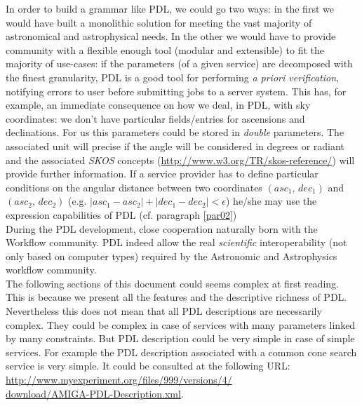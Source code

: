 \documentclass[a4paper,11pt] {ivoa}
\begin{document}
In order to build a grammar like PDL, we could go two ways: in the first we would have built a monolithic solution for meeting the vast majority of astronomical and astrophysical needs. In the other we would have to provide community with a flexible enough tool  (modular and extensible) to fit the majority of use-cases: if the parameters (of a given service) are decomposed with the finest granularity, PDL is a good tool for performing {\it a priori verification}, notifying errors to user before submitting jobs to a server system.
This has, for example, an immediate consequence on how we deal, in PDL, with sky coordinates: we don't have particular fields/entries for ascensions and declinations. For us this parameters could be stored in {\it double} parameters. The associated unit will precise if the angle will be considered in degrees or radiant  and the associated {\it SKOS} concepts
(\href{http://www.w3.org/TR/skos-reference/}{http://www.w3.org/TR/skos-reference/}) will provide further information. If a service provider has to define particular conditions on the angular distance between two coordinates $(asc_1, \, dec_1)$ and $(asc_2, \, dec_2)$ (e.g. $|asc_1- asc_2|+|dec_1-dec_2|<\epsilon$) he/she may use the expression capabilities of PDL (cf. paragraph \ref{par02})\\

\noindent During the PDL development, close cooperation naturally born with the Workflow community. PDL indeed allow the real {\it scientific} interoperability (not only based on computer types) required by the Astronomic and Astrophysics workflow community.\\

\noindent The following sections of this document could seems complex at first reading. This is because we present all the features and the descriptive richness  of PDL. Nevertheless this does  not mean that all PDL descriptions are necessarily complex. They could be complex in case of services with many parameters linked by many constraints. But PDL description could be very simple in case of simple services. 
For example the PDL description associated with a common cone search service is very simple. It could be consulted at the following URL:\\

\noindent \href{
http://www.myexperiment.org/files/999/versions/4/download/AMIGA-PDL-Description.xml
}{http://www.myexperiment.org/files/999/versions/4/\\download/AMIGA-PDL-Description.xml}.
\end{document}
